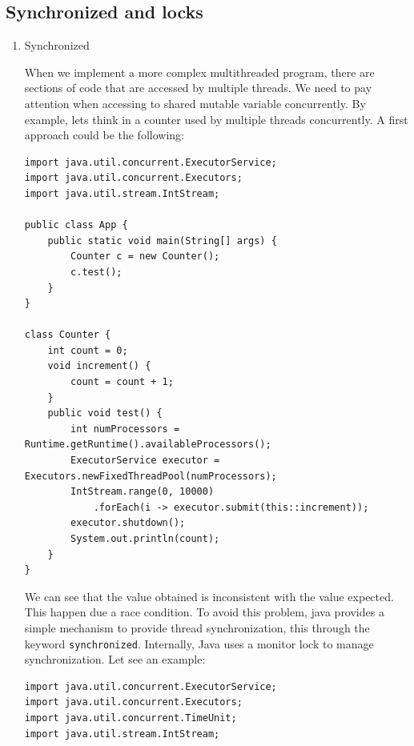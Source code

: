\documentclass{latex/classes/thesis}
\begin{document}
\subsection{Synchronized and locks}
\label{sec:orgd550a00}


\begin{enumerate}
\item Synchronized
\label{sec:orgb3cd1bd}

When we implement a more complex multithreaded program, there are sections
of code that are accessed by multiple threads. We need to pay attention when
accessing to shared mutable variable concurrently. By example, lets think in
a counter used by multiple threads concurrently. A first approach could be
the following:

\begin{lstlisting}
import java.util.concurrent.ExecutorService;
import java.util.concurrent.Executors;
import java.util.stream.IntStream;

public class App {
    public static void main(String[] args) {
        Counter c = new Counter();
        c.test();
    }
}

class Counter {
    int count = 0;
    void increment() {
        count = count + 1;
    }
    public void test() {
        int numProcessors = Runtime.getRuntime().availableProcessors();
        ExecutorService executor = Executors.newFixedThreadPool(numProcessors);
        IntStream.range(0, 10000)
            .forEach(i -> executor.submit(this::increment));
        executor.shutdown();
        System.out.println(count);
    }
}
\end{lstlisting}

We can see that the value obtained is inconsistent with the value
expected. This happen due a race condition.  To avoid this problem, java
provides a simple mechanism to provide thread synchronization, this through
the keyword \texttt{synchronized}. Internally, Java uses a monitor lock to manage
synchronization. Let see an example:

\begin{lstlisting}
import java.util.concurrent.ExecutorService;
import java.util.concurrent.Executors;
import java.util.concurrent.TimeUnit;
import java.util.stream.IntStream;


\end{lstlisting}
\end{enumerate}
\end{document}
